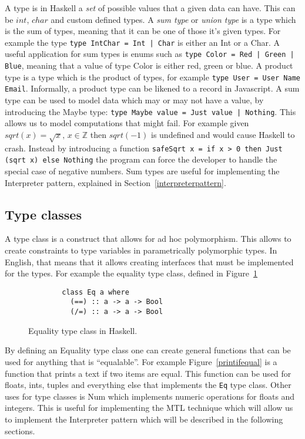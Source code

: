 A type is in Haskell a \textit{set} of possible values that a given data can
have. This can be $int$, $char$ and custom defined types. A \textit{sum type} or
\textit{union type} is a type which is the sum of types, meaning that it can be
one of those it's given types. For example the type \texttt{type IntChar = Int |
Char} is either an Int or a Char. A useful application for sum types is enums
such as \texttt{type Color = Red | Green | Blue}, meaning that a value of type
Color is either red, green or blue. A product type is a type which is the
product of types, for example \texttt{type User = User Name Email}.  Informally,
a product type can be likened to a record in Javascript. A sum type can be used
to model data which may or may not have a value, by introducing the Maybe type:
\texttt{type Maybe value = Just value | Nothing}. This allows us to model
computations that might fail. For example given $sqrt(x) = \sqrt{x},\, x\in
\mathbb{Z}$ then $sqrt(-1)$ is undefined and would cause Haskell to crash.
Instead by introducing a function \texttt{safeSqrt x = if x > 0 then Just (sqrt
x) else Nothing} the program can force the developer to handle the special case
of negative numbers. Sum types are useful for implementing the Interpreter
pattern, explained in Section~\ref{interpreterpattern}.

\subsection{Type classes}\label{typeclass}

A type class is a construct that allows for ad hoc polymorphism. This allows to
create constraints to type variables in parametrically polymorphic types. In
English, that means that it allows creating interfaces that must be implemented
for the types. For example the equality type class, defined in
Figure~\ref{equalitytypeclass}

\begin{figure}[H]
    \begin{lstlisting}
        class Eq a where
          (==) :: a -> a -> Bool
          (/=) :: a -> a -> Bool
    \end{lstlisting}
    \caption{Equality type class in Haskell.}
    \label{equalitytypeclass}
\end{figure}

By defining an Equality type class one can create general functions that can be
used for anything that is ``equalable''. For example Figure~\ref{printifequal}
is a function that prints a text if two items are equal. This function can be
used for floats, ints, tuples and everything else that implements the
\texttt{Eq} type class. Other uses for type classes is Num which implements
numeric operations for floats and integers. This is useful for implementing the
MTL technique which will allow us to implement the Interpreter pattern which
will be described in the following sections.

